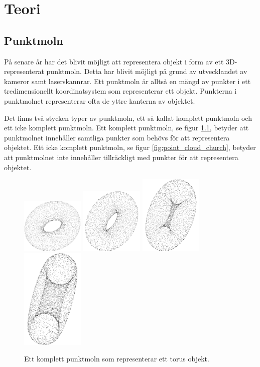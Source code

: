 \chapter{Teori}
\label{cha:theory}

\section{Punktmoln}
På senare år har det blivit möjligt att representera objekt i form av ett 3D-representerat punktmoln. Detta har blivit möjligt på grund av utvecklandet av kameror samt laserskannrar. Ett punktmoln är alltså en mängd av punkter i ett tredimensionellt koordinatsystem som representerar ett objekt. Punkterna i punktmolnet representerar ofta de yttre kanterna av objektet.

Det finns två stycken typer av punktmoln, ett så kallat komplett punktmoln och ett icke komplett punktmoln. Ett komplett punktmoln, se figur \ref{fig:point_cloud_torus}, betyder att punktmolnet innehåller samtliga punkter som behövs för att representera objektet. Ett icke komplett punktmoln, se figur \ref{fig:point_cloud_church}, betyder att punktmolnet inte innehåller tillräckligt med punkter för att representera objektet. 

\begin{figure}[H]
	\centering
	\includegraphics[width=30mm]{figures/Point_cloud_torus1.png}
	\includegraphics[width=30mm]{figures/Point_cloud_torus2.png}
	\includegraphics[width=30mm]{figures/Point_cloud_torus3.png}
	\includegraphics[width=30mm]{figures/Point_cloud_torus4.png}
	\caption{Ett komplett punktmoln som representerar ett torus objekt.}
	\label{fig:point_cloud_torus}
\end{figure}

